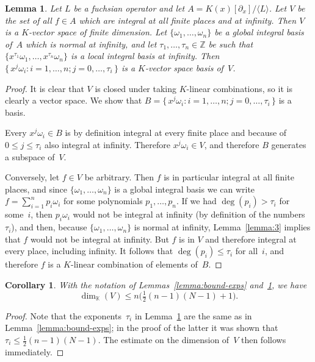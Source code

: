 \documentclass[final,1p,times,authoryear]{elsarticle}
\newtheorem{corollary}[theorem]{Corollary}
\newtheorem{lemma}[theorem]{Lemma}
\def\<#1>{\langle#1\rangle}
\let\set\mathbb
\begin{document}
\begin{lemma}\label{lemma:nopoles-space}
  Let $L$ be a fuchsian operator and let $A=K(x)[\partial_x]/\<L>$.
  Let $V$ be the set of all $f\in A$ which are integral at all finite places and at infinity.
  Then $V$ is a $K$-vector space of finite dimension.
  Let $\{\omega_1,\dots,\omega_n\}$ be a global integral basis of~$A$ which is normal at infinity,
  and let $\tau_1,\dots,\tau_n\in\set Z$ be such that $\{x^{\tau_1}\omega_1,\dots,x^{\tau_n}\omega_n\}$ is
  a local integral basis at infinity.
  Then $\{\,x^j\omega_i : i=1,\dots,n; j=0,\dots,\tau_i\,\}$ is a $K$-vector space basis of~$V$.
\end{lemma}
\begin{proof}
  It is clear that $V$ is closed under taking $K$-linear combinations, so it is clearly a vector space.
  We show that $B=\{\,x^j\omega_i : i=1,\dots,n; j=0,\dots,\tau_i\,\}$ is a basis.

  Every $x^j\omega_i\in B$ is by definition integral at every finite place and because of $0\leq j\leq \tau_i$ also
  integral at infinity. Therefore $x^j\omega_i\in V$, and therefore $B$ generates a subspace of~$V$.

  Conversely, let $f\in V$ be arbitrary. Then $f$ is in particular integral at all finite places,
  and since $\{\omega_1,\dots,\omega_n\}$ is a global integral basis we can write $f=\sum_{i=1}^n p_i\omega_i$
  for some polynomials $p_1,\dots,p_n$.
  If we had $\deg(p_i)>\tau_i$ for some~$i$, then $p_i\omega_i$ would not be integral at infinity
  (by definition of the numbers~$\tau_i$), and then, because $\{\omega_1,\dots,\omega_n\}$ is normal
  at infinity, Lemma~\ref{lemma:3} implies that $f$ would not be integral at infinity.
  But $f$ is in $V$ and therefore integral at every place, including infinity.
  It follows that $\deg(p_i)\leq \tau_i$ for all~$i$, and therefore $f$ is a $K$-linear combination
  of elements of~$B$.
\end{proof}

\begin{corollary}
With the notation of Lemmas~\ref{lemma:bound-exps}
and~\ref{lemma:nopoles-space}, we have
\[
  \dim_{\set K}(V)\leq n\bigl(\tfrac12(n-1)(N-1)+1\bigr).
\]
\end{corollary}
\begin{proof}
Note that the exponents~$\tau_i$ in Lemma~\ref{lemma:nopoles-space} are the
same as in Lemma~\ref{lemma:bound-exps}; in the proof of the latter it was
shown that $\tau_i\leq\frac12(n-1)(N-1)$. The estimate on the dimension of~$V$
then follows immediately.
\end{proof}
\end{document}
